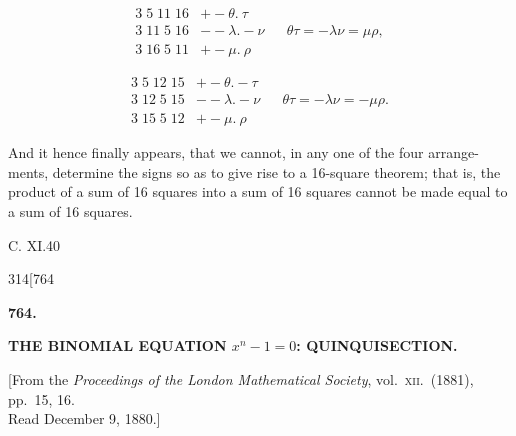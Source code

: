 \documentclass[11pt]{article}
\begin{document}
\begin{align*}
3\;5\;11\;16 & + -\theta.\ \tau & & \\
3\;11\;5\;16 & - -\lambda.-\nu & & \theta\tau = -\lambda\nu = \mu\rho, \\
3\;16\;5\;11 & + -\mu.\ \rho
\end{align*}

\begin{align*}
3\;5\;12\;15 & + -\theta.-\tau & & \\
3\;12\;5\;15 & - -\lambda.-\nu & & \theta\tau = -\lambda\nu = -\mu\rho. \\
3\;15\;5\;12 & + -\mu.\ \rho
\end{align*}

And it hence finally appears, that we cannot, in any one of the four arrange-ments,
determine the signs so as to give rise to a 16-square theorem; that is, the
product of a sum of 16 squares into a sum of 16 squares cannot be made equal to
a sum of 16 squares.

\begin{center}{\small C. XI.\hfill 40}\end{center}

\bigskip

\begin{center}
{\small 314\hfill\hfill [764}
\end{center}

\begin{center}\textbf{764.}\end{center}

\begin{center}\textbf{THE BINOMIAL EQUATION $x^n - 1 = 0$: QUINQUISECTION.}\end{center}

\begin{center}\small [From the \textit{Proceedings of the London Mathematical Society}, vol.\ \textsc{xii}.\ (1881), pp.\ 15, 16.\\
Read December 9, 1880.]\end{center}
\end{document}
